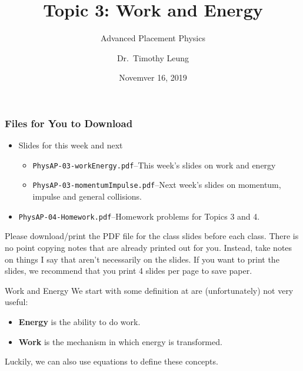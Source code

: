 \documentclass[12pt,compress,aspectratio=169]{beamer}
\title{Topic 3: Work and Energy}
\subtitle{Advanced Placement Physics}
\author[TML]{Dr.\ Timothy Leung}
\institute{Olympiads School}
\date{Novemver 16, 2019}
\begin{document}
\begin{frame}
  \maketitle
\end{frame}

\begin{frame}
  \frametitle{Files for You to Download}
  \begin{itemize}
  \item Slides for this week and next
    \begin{itemize}
    \item\texttt{PhysAP-03-workEnergy.pdf}--This week's slides on work and
      energy
    \item\texttt{PhysAP-03-momentumImpulse.pdf}--Next week's slides on momentum,
      impulse and general collisions.
    \end{itemize}
  \item\texttt{PhysAP-04-Homework.pdf}--Homework problems for Topics 3 and 4.
  \end{itemize}
  Please download/print the PDF file for the class slides before each class.
  There is no point copying notes that are already printed out for you.
  Instead, take notes on things I say that aren't necessarily on the slides.
  If you want to print the slides, we recommend that you print 4 slides per
  page to save paper.
\end{frame}



\begin{frame}{Work and Energy}
  We start with some definition at are (unfortunately) not very useful:
  \begin{itemize}
    \item \textbf{Energy} is the ability to do work.
    \item \textbf{Work} is the mechanism in which energy is transformed.
  \end{itemize}
  Luckily, we can also use equations to define these concepts.
\end{frame}
\end{document}
